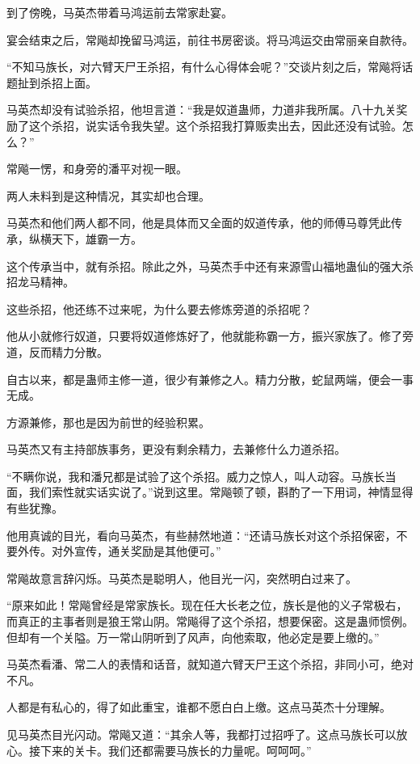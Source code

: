 
\begin{this_body}

到了傍晚，马英杰带着马鸿运前去常家赴宴。

宴会结束之后，常飚却挽留马鸿运，前往书房密谈。将马鸿运交由常丽亲自款待。

“不知马族长，对六臂天尸王杀招，有什么心得体会呢？”交谈片刻之后，常飚将话题扯到杀招上面。

马英杰却没有试验杀招，他坦言道：“我是奴道蛊师，力道非我所属。八十九关奖励了这个杀招，说实话令我失望。这个杀招我打算贩卖出去，因此还没有试验。怎么？”

常飚一愣，和身旁的潘平对视一眼。

两人未料到是这种情况，其实却也合理。

马英杰和他们两人都不同，他是具体而又全面的奴道传承，他的师傅马尊凭此传承，纵横天下，雄霸一方。

这个传承当中，就有杀招。除此之外，马英杰手中还有来源雪山福地蛊仙的强大杀招龙马精神。

这些杀招，他还练不过来呢，为什么要去修炼旁道的杀招呢？

他从小就修行奴道，只要将奴道修炼好了，他就能称霸一方，振兴家族了。修了旁道，反而精力分散。

自古以来，都是蛊师主修一道，很少有兼修之人。精力分散，蛇鼠两端，便会一事无成。

方源兼修，那也是因为前世的经验积累。

马英杰又有主持部族事务，更没有剩余精力，去兼修什么力道杀招。

“不瞒你说，我和潘兄都是试验了这个杀招。威力之惊人，叫人动容。马族长当面，我们索性就实话实说了。”说到这里。常飚顿了顿，斟酌了一下用词，神情显得有些犹豫。

他用真诚的目光，看向马英杰，有些赫然地道：“还请马族长对这个杀招保密，不要外传。对外宣传，通关奖励是其他便可。”

常飚故意言辞闪烁。马英杰是聪明人，他目光一闪，突然明白过来了。

“原来如此！常飚曾经是常家族长。现在任大长老之位，族长是他的义子常极右，而真正的主事者则是狼王常山阴。常飚得了这个杀招，想要保密。这是蛊师惯例。但却有一个关隘。万一常山阴听到了风声，向他索取，他必定是要上缴的。”

马英杰看潘、常二人的表情和话音，就知道六臂天尸王这个杀招，非同小可，绝对不凡。

人都是有私心的，得了如此重宝，谁都不愿白白上缴。这点马英杰十分理解。

见马英杰目光闪动。常飚又道：“其余人等，我都打过招呼了。这点马族长可以放心。接下来的关卡。我们还都需要马族长的力量呢。呵呵呵。”


\end{this_body}
